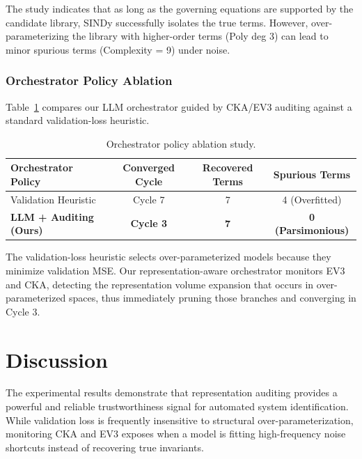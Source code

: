 \documentclass[twocolumn]{article}
\begin{document}
The study indicates that as long as the governing equations are supported by the candidate library, SINDy successfully isolates the true terms. However, over-parameterizing the library with higher-order terms (Poly deg 3) can lead to minor spurious terms (Complexity = 9) under noise.

\subsubsection{Orchestrator Policy Ablation}
Table~\ref{tab:orch_ablation} compares our LLM orchestrator guided by CKA/EV3 auditing against a standard validation-loss heuristic.

\begin{table}[htbp]
\centering
\caption{Orchestrator policy ablation study.}
\label{tab:orch_ablation}
\begin{tabular}{lccc}
\toprule
Orchestrator Policy & Converged Cycle & Recovered Terms & Spurious Terms \\
\midrule
Validation Heuristic & Cycle 7 & 7 & 4 (Overfitted) \\
\textbf{LLM + Auditing (Ours)} & \textbf{Cycle 3} & \textbf{7} & \textbf{0 (Parsimonious)} \\
\bottomrule
\end{tabular}
\end{table}

The validation-loss heuristic selects over-parameterized models because they minimize validation MSE. Our representation-aware orchestrator monitors EV3 and CKA, detecting the representation volume expansion that occurs in over-parameterized spaces, thus immediately pruning those branches and converging in Cycle 3.

\section{Discussion}
\label{sec:discussion}
The experimental results demonstrate that representation auditing provides a powerful and reliable trustworthiness signal for automated system identification. While validation loss is frequently insensitive to structural over-parameterization, monitoring CKA and EV3 exposes when a model is fitting high-frequency noise shortcuts instead of recovering true invariants.
\end{document}
